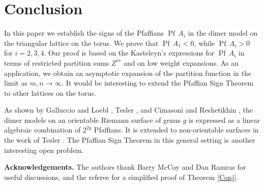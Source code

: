 \documentclass[12pt,reqno]{amsart}
\numberwithin{equation}{section}
\newcommand{\Pf}{{\operatorname{Pf}\,}}
\begin{document}
\section{Conclusion}

In this paper we establish the signs of the Pfaffians $\Pf A_i$ in the
dimer model on the triangular lattice on the torus. We prove that $\Pf A_1<0$,
while $\Pf A_i>0$ for $i=2,3,4$. Our proof is based on the Kasteleyn's
expressions for $\Pf A_i$ in terms of restricted partition sums $Z^{rs}$ and
on low weight expansions. As an application, we obtain an asymptotic expansion
of the partition function in the limit as $m,n\to\infty$.  It would be interesting to extend the Pfaffian Sign Theorem to other lattices on the torus.

As shown by Galluccio and Loebl \cite{GalluLoe}, Tesler \cite{Tes}, and Cimasoni and Reshetikhin \cite{CimResh}, the dimer models on an orientable  Riemann surface of genus $g$ is expressed as a linear algebraic combination of $2^{2g}$ Pfaffians. It is extended to non-orientable surfaces in the work of Tesler \cite{Tes}. The Pfaffian Sign Theorem in this general setting is another interesting open problem.

{\bf Acknowledgements.} The authors thank Barry McCoy and Dan Ramras for useful discussions, and the referee for a simplified proof of Theorem \ref{Conj}.
\end{document}
